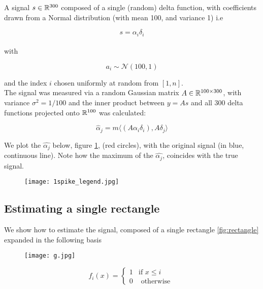 A signal \(s \in {\mathbb{R}}^{300}\) composed of a single (random) delta function, with coefficients drawn from a Normal distribution (with mean 100, and variance 1) i.e 

\begin{equation}
s = \alpha_i \delta_i
\end{equation}
\\
with 

\begin{equation}
a_i \sim \mathcal{N}\left(100, 1\right)
\end{equation}

and the index \(i\) chosen uniformly at random from \([1, n]\).
\\
The signal was measured via a random Gaussian matrix \(A \in {\mathbb{R}}^{100 \times 300}\), with variance \(\sigma^2 = 1/
100 \) and the inner product between \(y = As\) and all 300 delta functions projected onto \({\mathbb{R}}^{100}\) was calculated:

\begin{equation}
\hat{\alpha}_j = m\langle (A\alpha_i\delta_i), A\delta_j \rangle
\end{equation} 

We plot the \(\hat{\alpha_j}\) below, figure \ref{fig:new_basis_25}, (red circles), with the original signal (in blue, continuous line). Note how the maximum of the \(\hat{\alpha_j}\), coincides with the true signal.

\begin{figure}[h]
\centering
\texttt{[image: 1spike\_legend.jpg]}
\caption{}
\label{fig:new_basis_25}
\end{figure}

\subsection{Estimating a single rectangle}

We show how to estimate the signal, composed of a single rectangle \eqref{fig:rectangle} expanded in the following basis

\begin{figure}[h]
\centering
\texttt{[image: g.jpg]}
\caption{}
\label{fig:rectangle}
\end{figure}

\begin{equation}
f_i\left(x\right) =
\begin{cases}
1 & \text{if } x \leq i \\
0 & \text{ otherwise } 
\end{cases}
\label{basis}
\end{equation}

